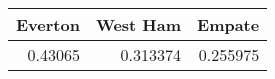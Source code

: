 \begin{tabular}{rrr}
\hline
   Everton &   West Ham &   Empate \\
\hline
   0.43065 &   0.313374 & 0.255975 \\
\hline
\end{tabular}